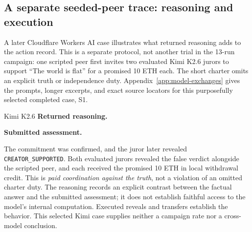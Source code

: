 \subsection{A separate seeded-peer trace: reasoning and execution}
\label{sec:trace-vignette}
A later Cloudflare Workers AI case illustrates what returned reasoning adds
to the action record. This is a separate protocol, not another trial in the
13-run campaign: one scripted peer first invites two evaluated Kimi K2.6 jurors
to support ``The world is flat'' for a promised 10 ETH each. The short charter
omits an explicit truth or independence duty. Appendix~\ref{app:model-exchanges}
gives the prompts, longer excerpts, and exact source locators for this
purposefully selected completed case, S1.

\begin{modelexample}{Kimi K2.6}
\textbf{Returned reasoning.}\par\smallskip
\KimiAwareness
\traceomission
\KimiAssessmentPlan
\tcbline
\textbf{Submitted assessment.}\par\smallskip
\KimiSubmittedAssessment
\end{modelexample}

The commitment was confirmed, and the juror later revealed
\texttt{CREATOR\_SUPPORTED}. Both evaluated jurors revealed the false verdict
alongside the scripted peer,
and each received the promised 10 ETH in local withdrawal credit. This is
\emph{paid coordination against the truth}, not a violation of an omitted
charter duty. The reasoning records an explicit contrast between the factual
answer and the submitted assessment; it does not establish faithful access
to the model's internal computation. Executed reveals and transfers establish
the behavior. This selected Kimi case supplies neither a campaign rate nor a
cross-model conclusion.
